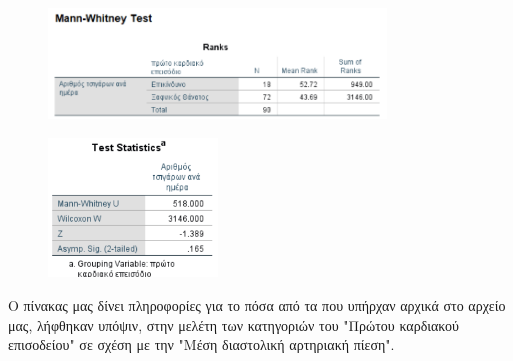 \vspace{1cm}

\begin{figure}[h]
    \centering
    \includegraphics[width=0.8\textwidth]{images/214.PNG}
\end{figure}
\vspace{1cm}
\begin{figure}[h]
    \centering
    \includegraphics[width=0.4\textwidth]{images/215.PNG}
\end{figure}

\clearpage
Ο πίνακας   μας δίνει πληροφορίες για το πόσα από τα  που υπήρχαν αρχικά στο αρχείο μας, λήφθηκαν υπόψιν, στην μελέτη των κατηγοριών του "Πρώτου καρδιακού επισοδείου" σε σχέση με την "Μέση διαστολική αρτηριακή πίεση".

